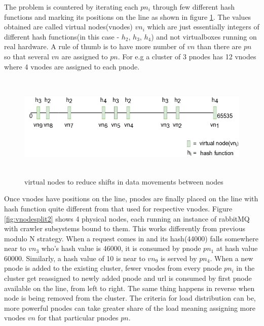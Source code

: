 \pagebreak

\noindent
The problem is countered by iterating each $pn_i$ through few different hash functions and marking its positions on the line as shown in figure \ref{fig:vnodesplit1}. The values obtained are called virtual nodes(vnodes) $vn_i$ which are just essentially integers of different hash functions(in this case - $h_2$, $h_3$, $h_4$) and not virtualboxes running on real hardware. A rule of thumb is to have more number of $vn$ than there are $pn$ so
that several $vn$ are assigned to $pn$. For e.g a cluster of 3 pnodes has 12 vnodes where 4 vnodes are assigned to each pnode.

\begin{figure}[h!]
  \centering
  \includegraphics[width=12cm,height=5cm,keepaspectratio]{../media/crawler/vnodesplit1.png}
  \caption{virtual nodes to reduce shifts in data movements between nodes}
  \label{fig:vnodesplit1}
\end{figure}

\noindent
Once vnodes have positions on the line, pnodes are finally placed on the line with hash function quite different from that used for respective vnodes. Figure \ref{fig:vnodesplit2} shows 4 physical nodes, each running
an instance of rabbitMQ with crawler subsystems bound to them. This works differently from previous modulo N strategy. When a request comes in and its hash(44000) falls somewhere near to $vn_3$ who's hash value is 46000, it is consumed by pnode $pn_1$ at hash value 60000. Similarly, a hash value of 10 is near to $vn_9$ is served by $pn_4$. When a new pnode is added to the existing cluster, fewer vnodes from every pnode
$pn_i$ in the cluster get reassigned to newly added pnode and url is consumed by first pnode available on
the line, from left to right. The same thing happens in reverse when node is being removed from the cluster.
The criteria for load distribution can be, more powerful pnodes can take greater share of the load meaning
assigning more vnodes $vn$ for that particular pnodes $pn$.

